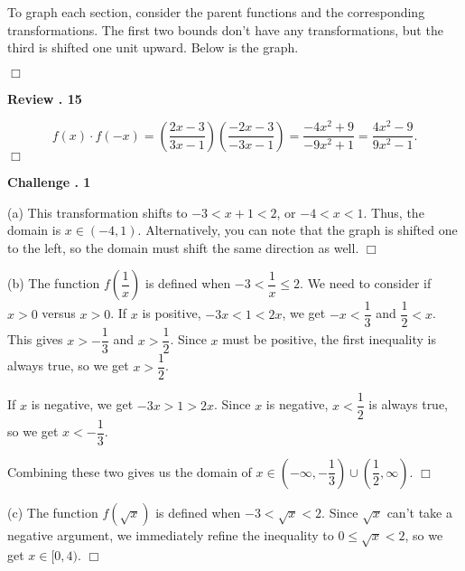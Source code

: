 \documentclass[lang=en,11pt]{elegantbook}
\begin{document}
To graph each section, consider the parent functions and the corresponding transformations.  The first two bounds don't have any transformations, but the third is shifted one unit upward.  Below is the graph.
\begin{figure}[!ht]
    \centering
\end{figure} $\Box$

\noindent \textbf{Review . 15}

$$f(x) \cdot f(-x) =\left(\dfrac{2x-3}{3x-1}\right)\left(\dfrac{-2x-3}{-3x-1}\right)=\dfrac{-4x^2+9}{-9x^2+1}=\boxed{\dfrac{4x^2-9}{9x^2-1}}.$$ $\Box$

\noindent \textbf{Challenge . 1}

(a) This transformation shifts to $-3 < x+1 < 2$, or $-4 < x < 1$.  Thus, the domain is $\boxed{x\in(-4,1)}$. Alternatively, you can note that the graph is shifted one to the left, so the domain must shift the same direction as well. $\Box$

(b) The function $f\left(\dfrac{1}{x}\right)$ is defined when $-3<\dfrac{1}{x}\leq 2$.  We need to consider if $x>0$ versus $x>0$.  If $x$ is positive, $-3x < 1 < 2x$, we get $-x < \dfrac{1}{3}$ and $\dfrac{1}{2} < x$.  This gives $x > -\dfrac{1}{3}$ and $x > \dfrac{1}{2}$.  Since $x$ must be positive, the first inequality is always true, so we get $x>\dfrac{1}{2}$.

If $x$ is negative, we get $-3x > 1 > 2x$.  Since $x$ is negative, $x<\dfrac{1}{2}$ is always true, so we get $x<-\dfrac{1}{3}$.

Combining these two gives us the domain of $\boxed{x\in\left(-\infty,-\dfrac{1}{3}\right)\cup\left(\dfrac{1}{2},\infty\right)}$. $\Box$

(c) The function $f\left(\sqrt{x}\right)$ is defined when $-3<\sqrt{x}<2$.  Since $\sqrt{x}$ can't take a negative argument, we immediately refine the inequality to $0\leq\sqrt{x}<2$, so we get $\boxed{x\in[0,4)}$. $\Box$
\end{document}

